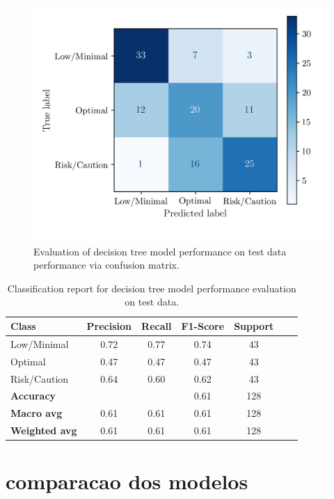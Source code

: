 \documentclass[conference]{IEEEtran}
\begin{document}
\begin{figure}[H]
    \centering
    \includegraphics[width=1\linewidth]{assets/DTREE_ConfusionMatrixTest.png}
    \caption{Evaluation of decision tree model performance on test data performance via confusion matrix.}
    \label{dtree_cmtest}
\end{figure}

\begin{table}[H]
\centering
\caption{Classification report for decision tree model performance evaluation on test data.}
\begin{tabular}{lcccccc}
\toprule
\textbf{Class} & \textbf{Precision} & \textbf{Recall} & \textbf{F1-Score} & \textbf{Support} \\
\midrule
Low/Minimal & 0.72 & 0.77 & 0.74 & 43 \\
Optimal & 0.47 & 0.47 & 0.47 & 43 \\
Risk/Caution & 0.64 & 0.60 & 0.62 & 43 \\
\midrule
\textbf{Accuracy} &  &  & 0.61 & 128 \\
\textbf{Macro avg} & 0.61 & 0.61 & 0.61 & 128 \\
\textbf{Weighted avg} & 0.61 & 0.61 & 0.61 & 128 \\
\bottomrule
\end{tabular}
\end{table}

\section{comparacao dos modelos}
\end{document}
